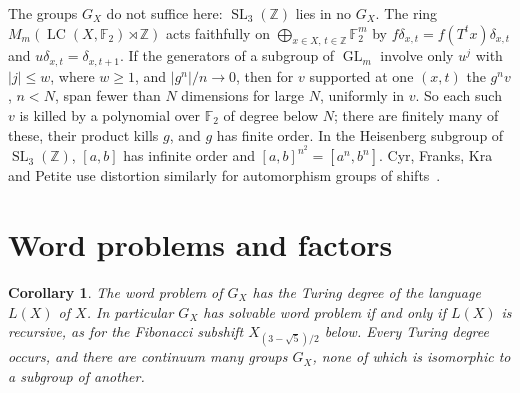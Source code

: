 \documentclass[11pt]{amsart}
\newtheorem{corollary}[theorem]{Corollary}
\newcommand{\F}{\mathbb F}
\newcommand{\Z}{\mathbb Z}
\newcommand{\LC}{\operatorname{LC}}
\newcommand{\GL}{\operatorname{GL}}
\newcommand{\SL}{\operatorname{SL}}
\begin{document}
The groups $G_X$ do not suffice here: $\SL_3(\Z)$ lies in no $G_X$. The
ring $M_m(\LC(X,\F_2)\rtimes\Z)$ acts faithfully on
$\bigoplus_{x\in X,\,t\in\Z}\F_2^m$ by $f\delta_{x,t}=f(T^tx)\delta_{x,t}$
and $u\delta_{x,t}=\delta_{x,t+1}$. If the generators of a subgroup of
$\GL_m$ involve only $u^j$ with $|j|\le w$, where $w\ge1$, and
$|g^n|/n\to0$, then for $v$ supported at one $(x,t)$ the $g^nv$, $n<N$,
span fewer than $N$ dimensions for large $N$, uniformly in $v$. So each
such $v$ is killed by a polynomial over $\F_2$ of degree below $N$; there
are finitely many of these, their product kills $g$, and $g$ has finite
order. In the
Heisenberg subgroup of $\SL_3(\Z)$, $[a,b]$ has infinite order and
$[a,b]^{n^2}=[a^n,b^n]$. Cyr, Franks, Kra and Petite use distortion
similarly for automorphism groups of shifts~\cite{CFKP}.

\section{Word problems and factors}\label{sec:wp}

\begin{corollary}\label{cor:wp}
The word problem of $G_X$ has the Turing degree of the language $L(X)$
of $X$. In particular $G_X$ has solvable word problem if and only if
$L(X)$ is recursive, as for the Fibonacci subshift $X_{(3-\sqrt5)/2}$
below. Every Turing degree occurs, and there are continuum many groups
$G_X$, none of which is isomorphic to a subgroup of another.
\end{corollary}
\end{document}
